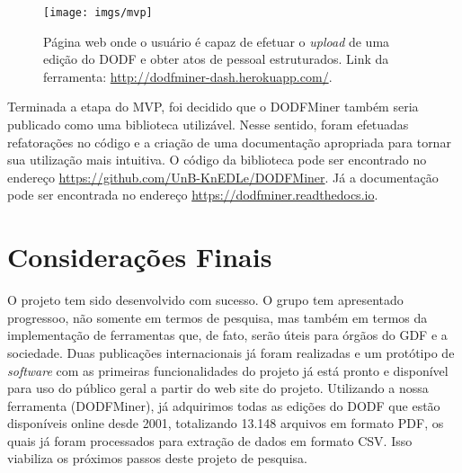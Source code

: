 \documentclass[12pt]{article}
\begin{document}
\begin{figure}[ht!]
    \centering
    \texttt{[image: imgs/mvp]}
    \caption{Página web onde o usuário é capaz de efetuar o \textit{upload} de uma edição do DODF e obter atos de pessoal estruturados. Link da ferramenta: \url{http://dodfminer-dash.herokuapp.com/}. }
    \label{fig:mvp}
\end{figure}



Terminada a etapa do MVP, foi decidido que o DODFMiner também seria publicado como uma biblioteca utilizável. Nesse sentido, foram efetuadas refatorações no código e a criação de uma documentação apropriada para tornar sua utilização mais intuitiva. O código da biblioteca pode ser encontrado no endereço \href{https://github.com/UnB-KnEDLe/DODFMiner}{https://github.com/UnB-KnEDLe/DODFMiner}. Já a documentação pode ser encontrada no endereço \url{https://dodfminer.readthedocs.io}.





\section{Considerações Finais}
\label{sec:consideracoes}

O projeto tem sido desenvolvido com sucesso. O grupo tem apresentado progressoo, não somente em termos de pesquisa, mas também em termos da implementação de ferramentas que, de fato, serão úteis para 
órgãos do GDF e a sociedade. Duas publicações internacionais já foram realizadas e um protótipo de \textit{software} com as primeiras funcionalidades do projeto já está pronto e disponível para uso do público geral a partir do web site do projeto.
Utilizando a nossa ferramenta (DODFMiner), já adquirimos todas as edições do DODF 
que estão disponíveis online desde 2001, totalizando 13.148 arquivos em formato PDF,
os quais já foram processados para extração de dados em formato CSV. 
Isso viabiliza os próximos passos deste projeto de pesquisa.
\end{document}
